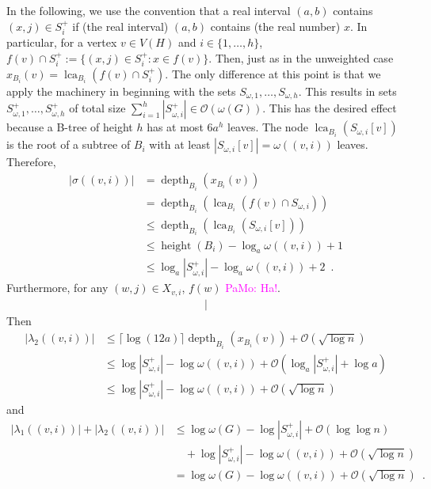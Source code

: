 \documentclass{patmorin}
\renewcommand{\le}{\leqslant}
\newcommand{\pat}[1]{\noindent\textcolor{Magenta}{PaMo: #1}}
\DeclareMathOperator{\height}{height}
\DeclareMathOperator{\depth}{depth}
\DeclareMathOperator{\lca}{lca}
\newcommand{\Oh}{\calO}
\newcommand{\calO}{\mathcal{O}}
\begin{document}
  In the following, we use the convention that a real interval $(a,b)$ contains $(x,j)\in S^+_i$ if (the real interval) $(a,b)$ contains (the real number) $x$. In particular, for a vertex $v\in V(H)$ and $i\in\{1,\ldots,h\}$, $f(v)\cap S^+_i:=\{(x,j)\in S^+_i:x\in f(v)\}$. Then, just as in the unweighted case $x_{B_i}(v)=\lca_{B_i}(f(v)\cap S^+_i)$.  The only difference at this point is that we apply the machinery in \cite{gawrychowski.janczewski:simpler,dujmovic.esperet.ea:adjacency} beginning with the sets $S_{\omega,1},\ldots,S_{\omega,h}$.
  This results in sets $S^+_{\omega,1},\ldots,S^+_{\omega,h}$ of total size $\sum_{i=1}^h |S^+_{\omega,i}|\in \Oh(\omega(G))$.
  This has the desired effect because a B-tree of height $h$ has at most $6a^h$ leaves.
  The node $\lca_{B_i}(S_{\omega,i}[v])$ is the root of a subtree of $B_i$ with at least $|S_{\omega,i}[v]|=\omega((v,i))$ leaves.
  Therefore,
  \begin{align*}
    |\sigma((v,i))|
    & =
     \depth_{B_i}(x_{B_i}(v)) \\
     & =
     \depth_{B_i}(\lca_{B_i}(f(v)\cap S_{\omega,i})) \\
     & \le
     \depth_{B_i}(\lca_{B_i}(S_{\omega,i}[v])) \\
     & \le\height(B_i)-\log_a\omega((v,i))+1 \\
     & \le \log_a|S^+_{\omega,i}| - \log_a\omega((v,i)) + 2 \enspace .
  \end{align*}
  Furthermore, for any $(w,j)\in X_{v,i}$, $f(w)$ \pat{Ha!}.
  \begin{align*}
      |
  \end{align*}
  Then
  \begin{align*}
     |\lambda_2((v,i))|
     & \le \lceil \log(12a)\rceil \depth_{B_i}(x_{B_i}(v)) 
        + \Oh(\sqrt{\log n}) \\
     & \le \log |S^+_{\omega,i}|-\log \omega((v,i)) + \Oh(\log_a|S^+_{\omega,i}|+ \log a) \\
     & \le \log |S^+_{\omega,i}|-\log \omega((v,i)) + \Oh(\sqrt{\log n})
  \end{align*}
  and
  \begin{align*}
     |\lambda_1((v,i))|+|\lambda_2((v,i))|
     & \le \log\omega(G) - \log |S^+_{\omega,i}| + \Oh(\log\log n) \\
     & \quad {} + \log |S^+_{\omega,i}|-\log \omega((v,i)) + \Oh(\sqrt{\log n}) \\
     & = \log\omega(G) - \log\omega((v,i)) + \Oh(\sqrt{\log n}) \enspace .
  \end{align*}
\end{document}
